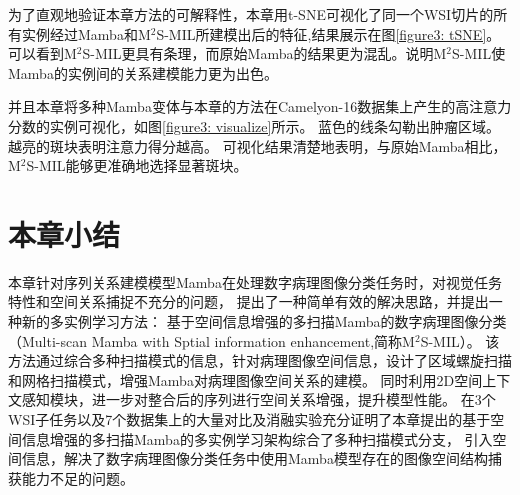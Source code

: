 为了直观地验证本章方法的可解释性，本章用t-SNE可视化了同一个WSI切片的所有实例经过Mamba和M$^2$S-MIL所建模出后的特征,结果展示在图\ref{figure3: tSNE}。
可以看到M$^2$S-MIL更具有条理，而原始Mamba的结果更为混乱。说明M$^2$S-MIL使Mamba的实例间的关系建模能力更为出色。

并且本章将多种Mamba变体与本章的方法在Camelyon-16数据集上产生的高注意力分数的实例可视化，如图\ref{figure3: visualize}所示。
蓝色的线条勾勒出肿瘤区域。越亮的斑块表明注意力得分越高。
可视化结果清楚地表明，与原始Mamba相比，M$^2$S-MIL能够更准确地选择显著斑块。
 

\section[\hspace{-2pt}本章小结]{{\heiti{} \hspace{-8pt}本章小结}}\label{section3: 本章小结}

本章针对序列关系建模模型Mamba在处理数字病理图像分类任务时，对视觉任务特性和空间关系捕捉不充分的问题，
提出了一种简单有效的解决思路，并提出一种新的多实例学习方法：
基于空间信息增强的多扫描Mamba的数字病理图像分类（Multi-scan Mamba with Sptial information enhancement,简称M$^2$S-MIL）。
该方法通过综合多种扫描模式的信息，针对病理图像空间信息，设计了区域螺旋扫描和网格扫描模式，增强Mamba对病理图像空间关系的建模。
同时利用2D空间上下文感知模块，进一步对整合后的序列进行空间关系增强，提升模型性能。
在3个WSI子任务以及7个数据集上的大量对比及消融实验充分证明了本章提出的基于空间信息增强的多扫描Mamba的多实例学习架构综合了多种扫描模式分支，
引入空间信息，解决了数字病理图像分类任务中使用Mamba模型存在的图像空间结构捕获能力不足的问题。
